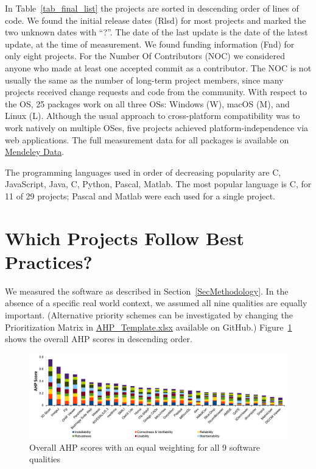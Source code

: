 \documentclass[draft, 12pt, 3p, times]{elsarticle} %
\newcommand{\CC}{C\nolinebreak\hspace{-.05em}\raisebox{.4ex}{\small\bf
+}\nolinebreak\hspace{-.10em}\raisebox{.4ex}{\small\bf +}}
\begin{document}
In Table~\ref{tab_final_list} the projects are sorted in descending order of
lines of code.  We found the initial release dates (Rlsd) for most projects and
marked the two unknown dates with ``?''. The date of the last update is the date
of the latest update, at the time of measurement. We found funding information
(Fnd) for only eight projects.  For the Number Of Contributors (NOC) we
considered anyone who made at least one accepted commit as a contributor. The
NOC is not usually the same as the number of long-term project members, since
many projects received change requests and code from the community.  With
respect to the OS, 25 packages work on all three OSs: Windows (W), macOS (M),
and Linux (L). Although the usual approach to cross-platform compatibility was
to work natively on multiple OSes, five projects achieved platform-independence
via web applications. The full measurement data for all packages is available on
\href{https://data.mendeley.com/datasets/k3pcdvdzj2/1} {Mendeley Data}.  

The programming languages used in order of decreasing popularity are \CC,
JavaScript, Java, C, Python, Pascal, Matlab.  The most popular language is \CC,
for 11 of 29 projects; Pascal and Matlab were each used for a single project.

\section{Which Projects Follow Best Practices?} \label{SecMeasurementResults}

We measured the software as described in Section~\ref{SecMethodology}.  In the
absence of a specific real world context, we assumed all nine qualities are
equally important.  (Alternative priority schemes can be investigated by
changing the Prioritization Matrix in
\href{https://github.com/smiths/AIMSS/blob/master/StateOfPractice/AHP2021/MedicalImaging/AHP_Template.xlsx}
{AHP\_Template.xlsx} available on GitHub.) Figure~\ref{fg_overall_scores} shows
the overall AHP scores in descending order.

\begin{figure}[ht!]
\includegraphics[scale=0.47]{Figure2_overall_scores}
\caption{Overall AHP scores with an equal weighting for all 9 software
qualities}

\label{fg_overall_scores}
\end{figure}
\end{document}
